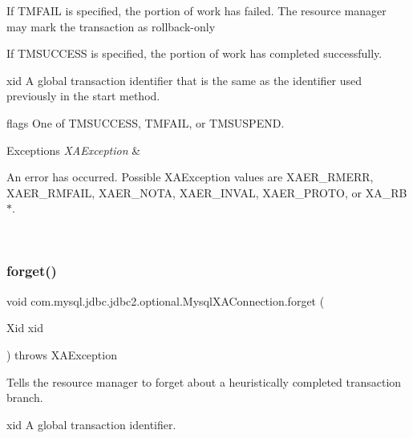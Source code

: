 If T\+M\+F\+A\+IL is specified, the portion of work has failed. The resource manager may mark the transaction as rollback-\/only

If T\+M\+S\+U\+C\+C\+E\+SS is specified, the portion of work has completed successfully.

xid A global transaction identifier that is the same as the identifier used previously in the start method.

flags One of T\+M\+S\+U\+C\+C\+E\+SS, T\+M\+F\+A\+IL, or T\+M\+S\+U\+S\+P\+E\+ND.


\begin{DoxyExceptions}{Exceptions}
{\em X\+A\+Exception} & 
\begin{DoxyItemize}
\item An error has occurred. Possible X\+A\+Exception values are X\+A\+E\+R\+\_\+\+R\+M\+E\+RR, X\+A\+E\+R\+\_\+\+R\+M\+F\+A\+IL, X\+A\+E\+R\+\_\+\+N\+O\+TA, X\+A\+E\+R\+\_\+\+I\+N\+V\+AL, X\+A\+E\+R\+\_\+\+P\+R\+O\+TO, or X\+A\+\_\+\+R\+B$\ast$. 
\end{DoxyItemize}\\
\hline
\end{DoxyExceptions}
\mbox{\label{classcom_1_1mysql_1_1jdbc_1_1jdbc2_1_1optional_1_1_mysql_x_a_connection_a286ccbfb959c94172ea24b4aace83961}} 
\subsubsection{\texorpdfstring{forget()}{forget()}}
{\footnotesize\ttfamily void com.\+mysql.\+jdbc.\+jdbc2.\+optional.\+Mysql\+X\+A\+Connection.\+forget (\begin{DoxyParamCaption}\item[{Xid}]{xid }\end{DoxyParamCaption}) throws X\+A\+Exception}

Tells the resource manager to forget about a heuristically completed transaction branch.

xid A global transaction identifier.


